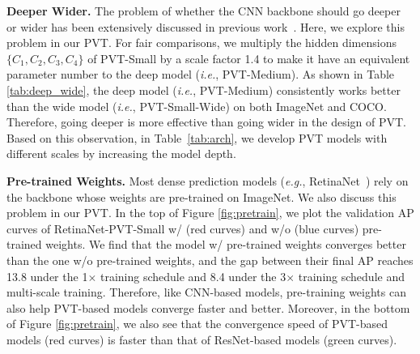 \documentclass[10pt,twocolumn,letterpaper]{article}
\def\ie{\emph{i.e.}}
\def\eg{\emph{e.g.}}
\begin{document}
\begin{table}[t]
    \centering
    \renewcommand\arraystretch{ 1.0}
    \footnotesize
    
    \caption{\textbf{Deeper \vs Wider.} ``Top-1'' denotes the top-1 error on the ImageNet validation set. ``AP'' denotes the bounding box AP on COCO \texttt{val2017}. The deep model (\ie, PVT-Medium) obtains better performance than the wide model (\ie, PVT-Small-Wide ) under comparable parameter number.}
    \label{tab:deep_wide}
\end{table}

\noindent\textbf{Deeper \vs Wider.} 
The problem of whether the CNN backbone should go deeper or wider has been extensively discussed in previous work~\cite{he2016deep,zerhouni2017wide}. Here, we explore this problem in our PVT.
For fair comparisons, we multiply the hidden dimensions $\{C_1, C_2, C_3, C_4\}$ of PVT-Small
%
by a scale factor 1.4 to make it have an equivalent parameter number to the deep model (\ie, PVT-Medium). As shown in Table \ref{tab:deep_wide}, the deep model (\ie, PVT-Medium) consistently works better than the wide model (\ie, PVT-Small-Wide) on both ImageNet and COCO. Therefore, going deeper is more effective than going wider in the design of PVT. Based on this observation, in Table~\ref{tab:arch}, we develop PVT models with different scales by increasing the model depth.



\noindent\textbf{Pre-trained Weights.} Most dense prediction models (\eg, RetinaNet~\cite{lin2017focal}) rely on the backbone whose weights are pre-trained on ImageNet. We also discuss this problem in our PVT. In the top of Figure \ref{fig:pretrain}, we plot the validation AP curves of RetinaNet-PVT-Small w/ ({red curves}) and w/o ({blue curves}) pre-trained weights.
We find that the model w/ pre-trained weights converges better than the one w/o pre-trained weights, 
%
and the gap between their final AP reaches 13.8 under the 1$\times$ training schedule and 8.4 under the 3$\times$ training schedule and multi-scale training.
%
Therefore, like CNN-based models, pre-training weights can also help PVT-based models converge faster and better.
%
Moreover, in the bottom of Figure \ref{fig:pretrain}, we also see that the convergence speed of PVT-based models ({red curves}) is faster than that of ResNet-based models ({green curves}).

\begin{table}[t]
    \centering
    \footnotesize
    \setlength{\tabcolsep}{1.8mm}
    
    \caption{\textbf{PVT \vs CNN w/ non-local.} AP$^{\rm m}$ denotes mask AP. Under similar parameter nubmer and GFLOPs, our PVT outperform the CNN backbone w/ Non-Local (ResNet50+GC r4) by 1.6 AP$^{\rm m}$ (37.8 ).}
    \label{tab:non_local}
\end{table}
\end{document}
